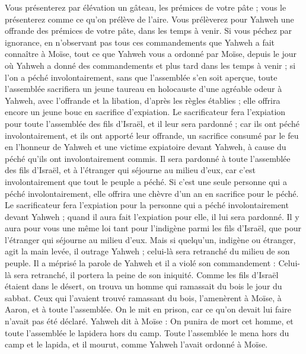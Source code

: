 \begin{multicols}{2}
Vous présenterez par élévation un gâteau, les prémices de votre pâte ; vous le présenterez comme ce qu’on prélève de l'aire.
Vous prélèverez pour Yahweh une offrande des prémices de votre pâte, dans les temps à venir.
Si vous péchez par ignorance, en n’observant pas tous ces commandements que Yahweh a fait connaître à Moïse,
tout ce que Yahweh vous a ordonné par Moïse, depuis le jour où Yahweh a donné des commandements et plus tard dans les temps à venir ;
si l’on a péché involontairement, sans que l'assemblée s’en soit aperçue, toute l'assemblée sacrifiera un jeune taureau en holocauste d’une agréable odeur à Yahweh, avec l’offrande et la libation, d’après les règles établies ; elle offrira encore un jeune bouc en sacrifice d’expiation.
Le sacrificateur fera l’expiation pour toute l'assemblée des fils d'Israël, et il leur sera pardonné ; car ils ont péché involontairement, et ils ont apporté leur offrande, un sacrifice consumé par le feu en l’honneur de Yahweh et une victime expiatoire devant Yahweh, à cause du péché qu’ils ont involontairement commis.
Il sera pardonné à toute l'assemblée des fils d'Israël, et à l'étranger qui séjourne au milieu d’eux, car c’est involontairement que tout le peuple a péché.
Si c’est une seule personne qui a péché involontairement, elle offrira une chèvre d'un an en sacrifice pour le péché.
Le sacrificateur fera l’expiation pour la personne qui a péché involontairement devant Yahweh ; quand il aura fait l’expiation pour elle, il lui sera pardonné.
Il y aura pour vous une même loi tant pour l’indigène parmi les fils d’Israël, que pour l'étranger qui séjourne au milieu d’eux.
Mais si quelqu’un, indigène ou étranger, agit la main levée, il outrage Yahweh ; celui-là sera retranché du milieu de son peuple.
Il a méprisé la parole de Yahweh et il a violé son commandement : Celui-là sera retranché, il portera la peine de son iniquité.
Comme les fils d'Israël étaient dans le désert, on trouva un homme qui ramassait du bois le jour du sabbat.
Ceux qui l’avaient trouvé ramassant du bois, l'amenèrent à Moïse, à Aaron, et à toute l'assemblée.
On le mit en prison, car ce qu'on devait lui faire n’avait pas été déclaré.
Yahweh dit à Moïse : On punira de mort cet homme, et toute l'assemblée le lapidera hors du camp.
Toute l'assemblée le mena hors du camp et le lapida, et il mourut, comme Yahweh l'avait ordonné à Moïse.

\end{multicols}
